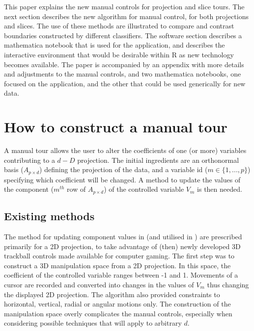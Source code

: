 \documentclass[]{interact}
\theoremstyle{plain}%
\theoremstyle{definition}
\theoremstyle{remark}
\begin{document}
This paper explains the new manual controls for projection and slice
tours. The next section describes the new algorithm for manual control,
for both projections and slices. The use of these methods are
illustrated to compare and contrast boundaries constructed by different
classifiers. The software section describes a mathematica notebook that
is used for the application, and describes the interactive environment
that would be desirable within R as new technology becomes available.
The paper is accompanied by an appendix with more details and
adjustments to the manual controls, and two mathematica notebooks, one
focused on the application, and the other that could be used generically
for new data.

\hypertarget{sec:method}{%
\section{How to construct a manual tour}\label{sec:method}}

A manual tour allows the user to alter the coefficients of one (or more)
variables contributing to a \(d-D\) projection. The initial ingredients
are an orthonormal basis (\(A_{p\times d}\)) defining the projection of
the data, and a variable id (\(m \in \{1, ..., p\}\)) specifying which
coefficient will be changed. A method to update the values of the
component (\(m^{th}\) row of \(A_{p\times d}\)) of the controlled
variable \(V_m\) is then needed.

\hypertarget{existing-methods}{%
\subsection{Existing methods}\label{existing-methods}}

The method for updating component values in \citet{cook_manual_1997}
(and utilised in \citet{spyrison_spinifex_2020}) are prescribed
primarily for a 2D projection, to take advantage of (then) newly
developed 3D trackball controls made available for computer gaming. The
first step was to construct a 3D manipulation space from a 2D
projection. In this space, the coefficient of the controlled variable
ranges between -1 and 1. Movements of a cursor are recorded and
converted into changes in the values of \(V_m\) thus changing the
displayed 2D projection. The algorithm also provided constraints to
horizontal, vertical, radial or angular motions only. The construction
of the manipulation space overly complicates the manual controls,
especially when considering possible techniques that will apply to
arbitrary \(d\).
\end{document}
